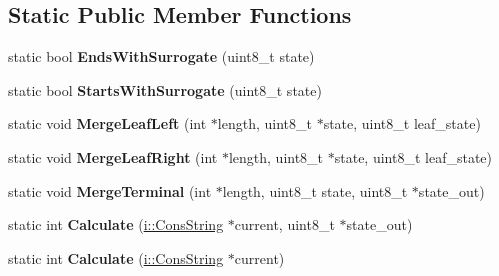 \subsection*{Static Public Member Functions}
\begin{DoxyCompactItemize}
\item 
\hypertarget{classv8_1_1_utf8_length_helper_ad8e5d910b375263f132db48aab6da786}{}static bool {\bfseries Ends\+With\+Surrogate} (uint8\+\_\+t state)\label{classv8_1_1_utf8_length_helper_ad8e5d910b375263f132db48aab6da786}

\item 
\hypertarget{classv8_1_1_utf8_length_helper_a02d1622afeec32cc7226521dea334dc4}{}static bool {\bfseries Starts\+With\+Surrogate} (uint8\+\_\+t state)\label{classv8_1_1_utf8_length_helper_a02d1622afeec32cc7226521dea334dc4}

\item 
\hypertarget{classv8_1_1_utf8_length_helper_a9010472ac0eaf7be001f783d72800d1f}{}static void {\bfseries Merge\+Leaf\+Left} (int $\ast$length, uint8\+\_\+t $\ast$state, uint8\+\_\+t leaf\+\_\+state)\label{classv8_1_1_utf8_length_helper_a9010472ac0eaf7be001f783d72800d1f}

\item 
\hypertarget{classv8_1_1_utf8_length_helper_ad501b658a8c5dccb4f28c394d747d1a7}{}static void {\bfseries Merge\+Leaf\+Right} (int $\ast$length, uint8\+\_\+t $\ast$state, uint8\+\_\+t leaf\+\_\+state)\label{classv8_1_1_utf8_length_helper_ad501b658a8c5dccb4f28c394d747d1a7}

\item 
\hypertarget{classv8_1_1_utf8_length_helper_a866662cbccc1452c46c45bc185068235}{}static void {\bfseries Merge\+Terminal} (int $\ast$length, uint8\+\_\+t state, uint8\+\_\+t $\ast$state\+\_\+out)\label{classv8_1_1_utf8_length_helper_a866662cbccc1452c46c45bc185068235}

\item 
\hypertarget{classv8_1_1_utf8_length_helper_a08d4928ad93a207d1758d72a20a1c939}{}static int {\bfseries Calculate} (\hyperlink{classv8_1_1internal_1_1_cons_string}{i\+::\+Cons\+String} $\ast$current, uint8\+\_\+t $\ast$state\+\_\+out)\label{classv8_1_1_utf8_length_helper_a08d4928ad93a207d1758d72a20a1c939}

\item 
\hypertarget{classv8_1_1_utf8_length_helper_ac645ac9c82636113933d43c8d6ebde5a}{}static int {\bfseries Calculate} (\hyperlink{classv8_1_1internal_1_1_cons_string}{i\+::\+Cons\+String} $\ast$current)\label{classv8_1_1_utf8_length_helper_ac645ac9c82636113933d43c8d6ebde5a}

\end{DoxyCompactItemize}
